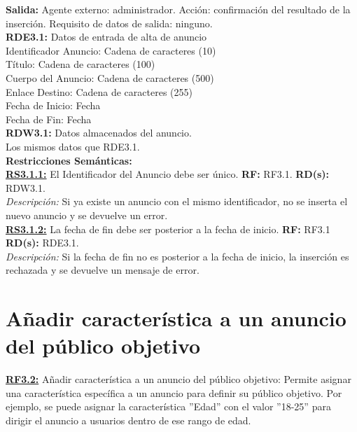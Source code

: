 \textbf{\textcolor{rojo}{Salida:}} Agente externo: administrador. Acción: confirmación del resultado de la inserción. 
Requisito de datos de salida: ninguno. \\[12pt]

\textcolor{azul}{\textbf{RDE3.1:}} Datos de entrada de alta de anuncio \\
\hspace*{1cm} Identificador Anuncio: Cadena de caracteres (10) \\
\hspace*{1cm} Título: Cadena de caracteres (100) \\
\hspace*{1cm} Cuerpo del Anuncio: Cadena de caracteres (500) \\
\hspace*{1cm} Enlace Destino: Cadena de caracteres (255) \\
\hspace*{1cm} Fecha de Inicio: Fecha \\
\hspace*{1cm} Fecha de Fin: Fecha \\[12pt]

\textcolor{azul}{\textbf{RDW3.1:}} Datos almacenados del anuncio. \\
\hspace*{1cm} Los mismos datos que RDE3.1. \\[12pt]

\textbf{\textcolor{verde}{Restricciones Semánticas:}} \\[6pt]
\textbf{\textcolor{verde}{\underline{RS3.1.1:}}} El Identificador del Anuncio debe ser único. \textbf{RF:} RF3.1. \textbf{RD(s):} RDW3.1. \\
\hspace*{1cm} \textit{Descripción:} Si ya existe un anuncio con el mismo identificador, no se inserta el nuevo anuncio y se devuelve un error. \\[6pt]

\textbf{\textcolor{verde}{\underline{RS3.1.2:}}} La fecha de fin debe ser posterior a la fecha de inicio. \textbf{RF:} RF3.1 \textbf{RD(s):} RDE3.1. \\
\hspace*{1cm} \textit{Descripción:} Si la fecha de fin no es posterior a la fecha de inicio, la inserción es rechazada y se devuelve un mensaje de error.

\section{Añadir característica a un anuncio del público objetivo}
\textbf{\textcolor{rojo}{\underline{RF3.2:}}} Añadir característica a un anuncio del público objetivo: Permite asignar una característica específica a un anuncio para definir su público objetivo. Por ejemplo, se puede asignar la característica ''Edad'' con el valor ''18-25'' para dirigir el anuncio a usuarios dentro de ese rango de edad. \\[6pt]

